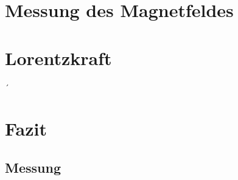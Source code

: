 \documentclass[a4paper,twoside,12pt,DIV=13,BCOR=5mm,numbers=noenddot,cleardoublepage=empty]{scrbook}
\begin{document}
\section{Messung des Magnetfeldes}

\section{Lorentzkraft}

´\section{Fazit}



\subsection{Messung} 
\end{document}
